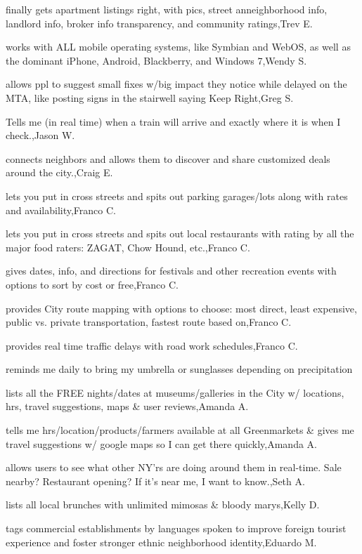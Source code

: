 \documentclass{article}
\begin{document}
finally gets apartment listings right, with pics, street anneighborhood info, landlord info, broker info transparency, and community ratings,Trev E.

works with ALL mobile operating systems, like Symbian and WebOS, as well as the dominant iPhone, Android, Blackberry, and Windows 7,Wendy S.

allows ppl to suggest small fixes w/big impact they notice while delayed on the MTA, like posting signs in the stairwell saying Keep Right,Greg S.

Tells me (in real time) when a train will arrive and exactly where it is when I check.,Jason W.

connects neighbors and allows them to discover and share customized deals around the city.,Craig E.

lets you put in cross streets and spits out parking garages/lots  along with rates and availability,Franco C.

lets you put in cross streets and spits out local restaurants with rating by all the major food raters:  ZAGAT, Chow Hound, etc.,Franco C.

gives dates, info, and directions for festivals and other recreation events with options to sort by cost or free,Franco C.

provides City route mapping with options to choose:  most direct, least expensive, public vs. private transportation, fastest route based on,Franco C.

provides real time traffic delays with road work schedules,Franco C.

reminds me daily to bring my umbrella or sunglasses depending on precipitation %

lists all the FREE nights/dates at museums/galleries in the City w/ locations, hrs, travel suggestions, maps \& user reviews,Amanda A.

tells me hrs/location/products/farmers available at all Greenmarkets \& gives me travel suggestions w/ google maps so I can get there quickly,Amanda A.

allows users to see what other NY'rs are doing around them in real-time. Sale nearby? Restaurant opening? If it's near me, I want to know.,Seth A.

lists all local brunches with unlimited mimosas \& bloody marys,Kelly D.

tags commercial establishments by languages spoken to improve foreign tourist experience and foster stronger ethnic neighborhood identity,Eduardo M.
\end{document}
